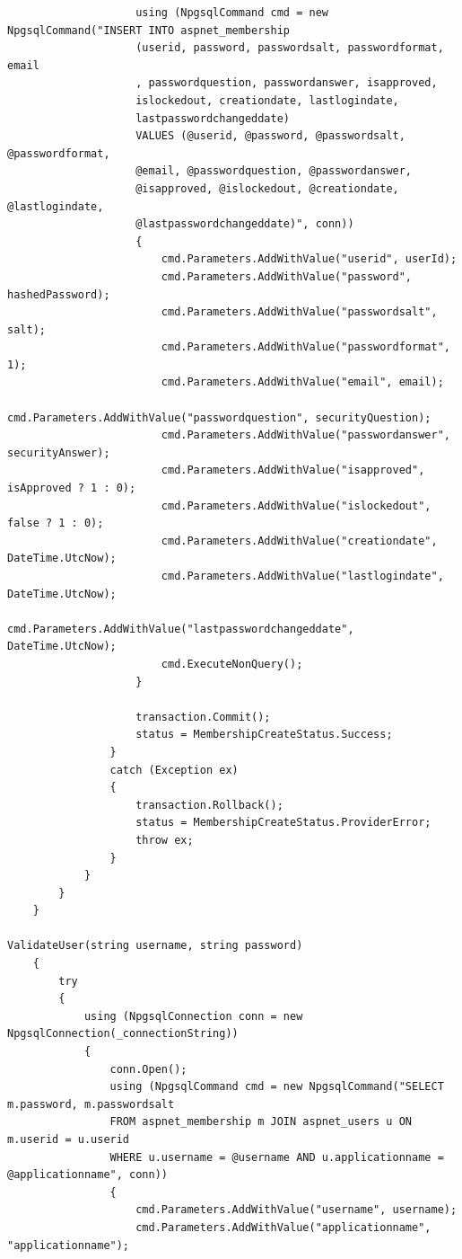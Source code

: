 \documentclass[14pt]{article}
\begin{document}
\begin{verbatim}
                    using (NpgsqlCommand cmd = new NpgsqlCommand("INSERT INTO aspnet_membership 
                    (userid, password, passwordsalt, passwordformat, email
                    , passwordquestion, passwordanswer, isapproved,
                    islockedout, creationdate, lastlogindate,
                    lastpasswordchangeddate) 
                    VALUES (@userid, @password, @passwordsalt, @passwordformat,
                    @email, @passwordquestion, @passwordanswer,
                    @isapproved, @islockedout, @creationdate, @lastlogindate,
                    @lastpasswordchangeddate)", conn))
                    {
                        cmd.Parameters.AddWithValue("userid", userId);
                        cmd.Parameters.AddWithValue("password", hashedPassword);
                        cmd.Parameters.AddWithValue("passwordsalt", salt);
                        cmd.Parameters.AddWithValue("passwordformat", 1);
                        cmd.Parameters.AddWithValue("email", email);
                        cmd.Parameters.AddWithValue("passwordquestion", securityQuestion);
                        cmd.Parameters.AddWithValue("passwordanswer", securityAnswer);
                        cmd.Parameters.AddWithValue("isapproved", isApproved ? 1 : 0);
                        cmd.Parameters.AddWithValue("islockedout", false ? 1 : 0);
                        cmd.Parameters.AddWithValue("creationdate", DateTime.UtcNow);
                        cmd.Parameters.AddWithValue("lastlogindate", DateTime.UtcNow);
                        cmd.Parameters.AddWithValue("lastpasswordchangeddate", DateTime.UtcNow);
                        cmd.ExecuteNonQuery();
                    }

                    transaction.Commit();
                    status = MembershipCreateStatus.Success;
                }
                catch (Exception ex)
                {
                    transaction.Rollback();
                    status = MembershipCreateStatus.ProviderError;
                    throw ex;
                }
            }
        }
    }

ValidateUser(string username, string password)
    {
        try
        {
            using (NpgsqlConnection conn = new NpgsqlConnection(_connectionString))
            {
                conn.Open();
                using (NpgsqlCommand cmd = new NpgsqlCommand("SELECT m.password, m.passwordsalt 
                FROM aspnet_membership m JOIN aspnet_users u ON m.userid = u.userid 
                WHERE u.username = @username AND u.applicationname = @applicationname", conn))
                {
                    cmd.Parameters.AddWithValue("username", username);
                    cmd.Parameters.AddWithValue("applicationname", "applicationname");


\end{verbatim}
\end{document}
